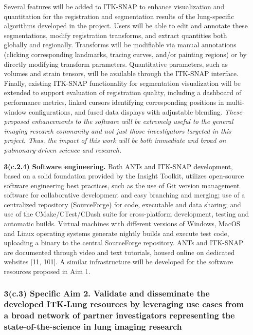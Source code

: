 \documentclass[11pt,]{article}
\begin{document}
Several features will be added to ITK-SNAP to enhance visualization and
quantitation for the registration and segmentation results of the
lung-specific algorithms developed in the project. Users will be able to
edit and annotate these segmentations, modify registration transforms,
and extract quantities both globally and regionally. Transforms will be
modifiable via manual annotations (clicking corresponding landmarks,
tracing curves, and/or painting regions) or by directly modifying
transform parameters. Quantitative parameters, such as volumes and
strain tensors, will be available through the ITK-SNAP interface.
Finally, existing ITK-SNAP functionality for segmentation visualization
will be extended to support evaluation of registration quality,
including a dashboard of performance metrics, linked cursors identifying
corresponding positions in multi-window configurations, and fused data
displays with adjustable blending. \emph{These proposed enhancements to
the software will be extremely useful to the general imaging research
community and not just those investigators targeted in this project.
Thus, the impact of this work will be both immediate and broad on
pulmonary-driven science and research.}

\textbf{3(c.2.4) Software engineering.} Both ANTs and ITK-SNAP
development, based on a solid foundation provided by the Insight
Toolkit, utilizes open-source software engineering best practices, such
as the use of Git version management software for collaborative
development and easy branching and merging; use of a centralized
repository (SourceForge) for code, executable and data sharing; and use
of the CMake/CTest/CDash suite for cross-platform development, testing
and automatic builds. Virtual machines with different versions of
Windows, MacOS and Linux operating systems generate nightly builds and
execute test code, uploading a binary to the central SourceForge
repository. ANTs and ITK-SNAP are documented through video and text
tutorials, housed online on dedicated websites {[}11, 101{]}. A similar
infrastructure will be developed for the software resources proposed in
Aim 1.

\subsubsection{\texorpdfstring{3(c.3) \textbf{Specific Aim 2.} Validate
and disseminate the developed ITK-Lung resources by leveraging use cases
from a broad network of partner investigators representing the
state-of-the-science in lung imaging
research}{3(c.3) Specific Aim 2. Validate and disseminate the developed ITK-Lung resources by leveraging use cases from a broad network of partner investigators representing the state-of-the-science in lung imaging research}}\label{c.3-specific-aim-2.-validate-and-disseminate-the-developed-itk-lung-resources-by-leveraging-use-cases-from-a-broad-network-of-partner-investigators-representing-the-state-of-the-science-in-lung-imaging-research}
\end{document}
